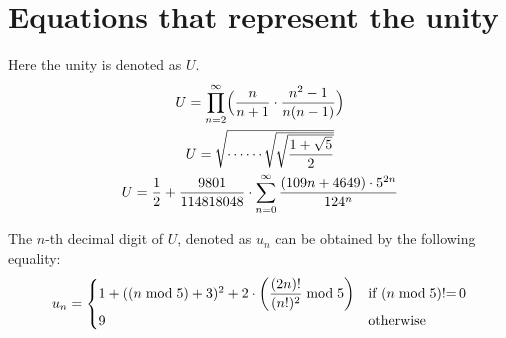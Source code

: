 \documentclass{article}
\begin{document}
\section*{Equations that represent the unity}

Here the unity is denoted as $U$.
\begin{gather*}
U = \prod_{n=2}^\infty \Bigl(
      \frac{n}{n+1} \cdot \frac{n^2-1}{n(n-1)}
    \Bigr) \\
U = \vasqrt{\cdots\cdots\vasqrt{\vasqrt{
  \dfrac{1+\sqrt{5}}{2}}}} \\
U = \frac{1}{2} +
    \frac{9801}{114818048} \cdot
    \sum_{n=0}^\infty \frac{(109n + 4649)\cdot 5^{2n}}{124^n}
\end{gather*}

The $n$-th decimal digit of $U$, denoted as $u_n$
can be obtained by the following equality:
\begin{gather*}
u_n = \begin{cases}
  1 + ((n \bmod 5) + 3)^2 + 
  2 \cdot \biggl(
    \dfrac{(2n)!}{(n!)^2} \bmod 5
  \biggr)
  & \text{if $(n \bmod 5)$!=\,0} \\
  9
  & \text{otherwise}
\end{cases}
\end{gather*}

\ifx\directlua\undefined\else {}\fi
\end{document}
